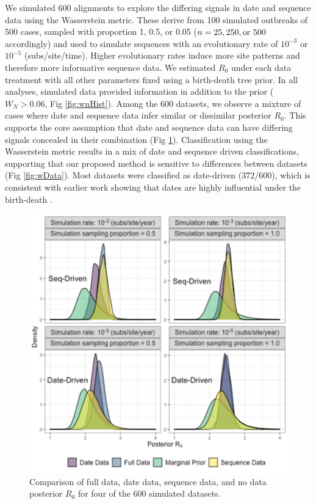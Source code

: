 \documentclass{article}
\begin{document}
We simulated 600 alignments to explore the differing signals in date and sequence data using the Wasserstein metric. These derive from 100 simulated outbreaks of 500 cases, sampled with proportion 1, 0.5, or 0.05 ($n = 25, 250, \textnormal{or } 500$ accordingly) and used to simulate sequences with an evolutionary rate of $10^{-3}$ or $10^{-5}$ (subs/site/time). Higher evolutionary rates induce more site patterns and therefore more informative sequence data. We estimated $R_0$ under each data treatment with all other parameters fixed using a birth-death tree prior. In all analyses, simulated data provided information in addition to the prior ($W_{N}>0.06$, Fig \ref{fig:wnHist}). Among the 600 datasets, we  observe a mixture of cases where date and sequence data infer similar or dissimilar posterior $R_{0}$. This supports the core assumption that date and sequence data can have differing signals concealed in their combination (Fig \ref{fig:posts}). Classification using the Wasserstein metric results in a mix of date and sequence driven classifications, supporting that our proposed method is sensitive to differences between datasets (Fig \ref{fig:wData}). Most datasets were classified as date-driven (372/600), which is consistent with earlier work showing that dates are highly influential under the birth-death \citep{volz_sampling_2014}.

\begin{figure}[H]
\centering
\includegraphics[width=1\linewidth]{../figures/postEg.pdf}
\caption{Comparison of full data, date data, sequence data, and no data posterior $R_0$ for four of the 600 simulated datasets. }
\label{fig:posts}
\end{figure}
\end{document}
